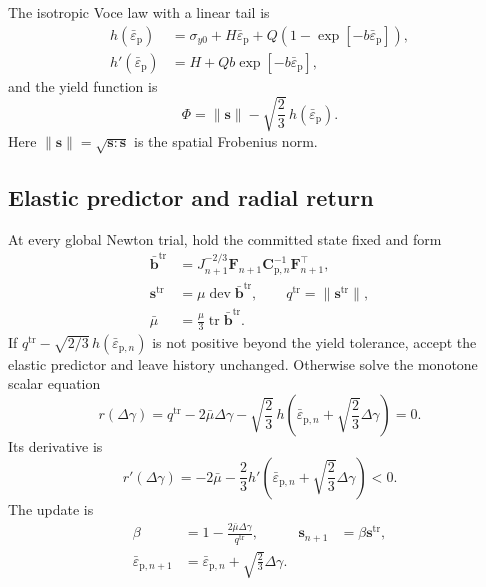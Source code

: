 \documentclass[11pt,a4paper]{article}
\newcommand{\bs}[1]{\boldsymbol{#1}}
\newcommand{\tr}{\operatorname{tr}}
\newcommand{\dev}{\operatorname{dev}}
\newcommand{\F}{\bs{F}}
\begin{document}
The isotropic Voce law with a linear tail is
\begin{align}
h(\bar\varepsilon_{\mathrm p})
&=\sigma_{y0}+H\bar\varepsilon_{\mathrm p}
+Q\left(1-\exp[-b\bar\varepsilon_{\mathrm p}]\right),\\
h'(\bar\varepsilon_{\mathrm p})
&=H+Qb\exp[-b\bar\varepsilon_{\mathrm p}],
\end{align}
and the yield function is
\begin{equation}
\Phi=\lVert\bs s\rVert-\sqrt{\frac23}\,h(\bar\varepsilon_{\mathrm p}).
\end{equation}
Here $\lVert\bs s\rVert=\sqrt{\bs s:\bs s}$ is the spatial Frobenius norm.

\subsection{Elastic predictor and radial return}

At every global Newton trial, hold the committed state fixed and form
\begin{align}
\bar{\bs b}^{\mathrm{tr}}
&=J_{n+1}^{-2/3}\F_{n+1}\bs C_{\mathrm p,n}^{-1}\F_{n+1}^{\top},\\
\bs s^{\mathrm{tr}}&=\mu\dev\bar{\bs b}^{\mathrm{tr}},
\qquad
q^{\mathrm{tr}}=\lVert\bs s^{\mathrm{tr}}\rVert,\\
\bar\mu&=\frac{\mu}{3}\tr\bar{\bs b}^{\mathrm{tr}}.
\end{align}
If $q^{\mathrm{tr}}-\sqrt{2/3}\,h(\bar\varepsilon_{\mathrm p,n})$ is not positive beyond the yield tolerance, accept the elastic predictor and leave history unchanged.  Otherwise solve the monotone scalar equation
\begin{equation}
r(\Delta\gamma)
=q^{\mathrm{tr}}-2\bar\mu\Delta\gamma
-\sqrt{\frac23}\,
h\left(\bar\varepsilon_{\mathrm p,n}+\sqrt{\frac23}\Delta\gamma\right)=0.
\label{eq:j2-return-scalar}
\end{equation}
Its derivative is
\begin{equation}
r'(\Delta\gamma)
=-2\bar\mu-\frac23 h'\left(\bar\varepsilon_{\mathrm p,n}+\sqrt{\frac23}\Delta\gamma\right)<0.
\end{equation}
The update is
\begin{align}
\beta&=1-\frac{2\bar\mu\Delta\gamma}{q^{\mathrm{tr}}},
&\bs s_{n+1}&=\beta\bs s^{\mathrm{tr}},\\
\bar\varepsilon_{\mathrm p,n+1}
&=\bar\varepsilon_{\mathrm p,n}+\sqrt{\frac23}\Delta\gamma.
\end{align}
\end{document}
